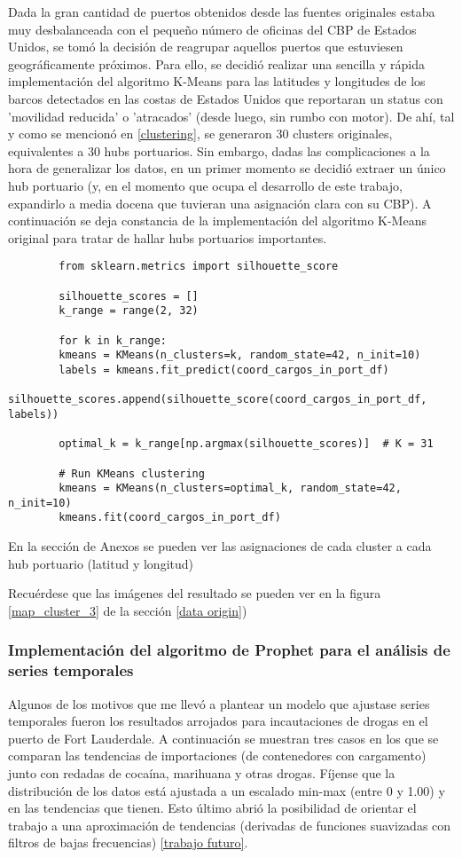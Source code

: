 \documentclass[12pt]{article}
\begin{document}
	Dada la gran cantidad de puertos obtenidos desde las fuentes originales estaba muy desbalanceada con el pequeño número de oficinas del CBP de Estados Unidos, se tomó la decisión de reagrupar aquellos puertos que estuviesen geográficamente próximos. Para ello, se decidió realizar una sencilla y rápida implementación del algoritmo K-Means para las latitudes y longitudes de los barcos detectados en las costas de Estados Unidos que reportaran un status con 'movilidad reducida' o 'atracados' (desde luego, sin rumbo con motor). De ahí, tal y como se mencionó en \ref{clustering}, se generaron 30 clusters originales, equivalentes a 30 hubs portuarios. Sin embargo, dadas las complicaciones a la hora de generalizar los datos, en un primer momento se decidió extraer un único hub portuario (y, en el momento que ocupa el desarrollo de este trabajo, expandirlo a media docena que tuvieran una asignación clara con su CBP). A continuación se deja constancia de la implementación del algoritmo K-Means original para tratar de hallar hubs portuarios importantes.
	
	\begin{verbatim}
		from sklearn.metrics import silhouette_score
		
		silhouette_scores = []
		k_range = range(2, 32) 
		
		for k in k_range:
		kmeans = KMeans(n_clusters=k, random_state=42, n_init=10)
		labels = kmeans.fit_predict(coord_cargos_in_port_df)
		silhouette_scores.append(silhouette_score(coord_cargos_in_port_df, labels))
		
		optimal_k = k_range[np.argmax(silhouette_scores)]  # K = 31
		
		# Run KMeans clustering
		kmeans = KMeans(n_clusters=optimal_k, random_state=42, n_init=10)
		kmeans.fit(coord_cargos_in_port_df)
	\end{verbatim}

	En la sección de Anexos se pueden ver las asignaciones de cada cluster a cada hub portuario (latitud y longitud)
	
	
	Recuérdese que las imágenes del resultado se pueden ver en la figura \ref{map_cluster_3} de la sección \ref{data origin})
	
	
	\subsubsection{Implementación del algoritmo de Prophet para el análisis de series temporales}
	Algunos de los motivos que me llevó a plantear un modelo que ajustase series temporales fueron los resultados arrojados para incautaciones de drogas en el puerto de Fort Lauderdale. A continuación se muestran tres casos en los que se comparan las tendencias de importaciones (de contenedores con cargamento) junto con redadas de cocaína, marihuana y otras drogas. Fíjense que la distribución de los datos está ajustada a un escalado min-max (entre 0 y 1.00) y en las tendencias que tienen. Esto último abrió la posibilidad de orientar el trabajo a una aproximación de tendencias (derivadas de funciones suavizadas con filtros de bajas frecuencias) \ref{trabajo futuro}.
	
\end{document}
